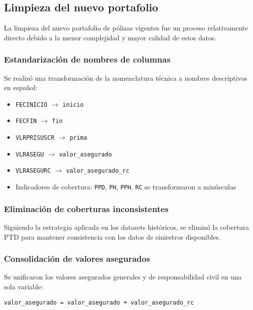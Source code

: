 \subsection{Limpieza del nuevo portafolio}

La limpieza del nuevo portafolio de pólizas vigentes fue un proceso relativamente directo debido a la menor complejidad y mayor calidad de estos datos.

\subsubsection{Estandarización de nombres de columnas}

Se realizó una transformación de la nomenclatura técnica a nombres descriptivos en español:

\begin{itemize}
    \item \texttt{FECINICIO} $\rightarrow$ \texttt{inicio}
    \item \texttt{FECFIN} $\rightarrow$ \texttt{fin}
    \item \texttt{VLRPRISUSCR} $\rightarrow$ \texttt{prima}
    \item \texttt{VLRASEGU} $\rightarrow$ \texttt{valor\_asegurado}
    \item \texttt{VLRASEGURC} $\rightarrow$ \texttt{valor\_asegurado\_rc}
    \item Indicadores de cobertura: \texttt{PPD}, \texttt{PH}, \texttt{PPH}, \texttt{RC} se transformaron a minúsculas
\end{itemize}

\subsubsection{Eliminación de coberturas inconsistentes}

Siguiendo la estrategia aplicada en los datasets históricos, se eliminó la cobertura PTD para mantener consistencia con los datos de siniestros disponibles.

\subsubsection{Consolidación de valores asegurados}

Se unificaron los valores asegurados generales y de responsabilidad civil en una sola variable:

\begin{center}
\texttt{valor\_asegurado = valor\_asegurado + valor\_asegurado\_rc}
\end{center}

